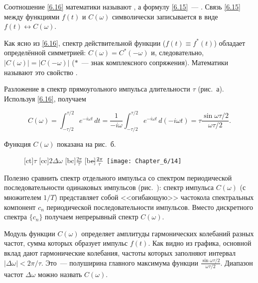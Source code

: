 Соотношение \eqref{6.16} математики называют , а формулу \eqref{6.15}~--- . Связь \eqref{6.15} между функциями $f(t)$ и $C(\omega)$ символически записывается в виде
$f(t)\leftrightarrow C(\omega)$.

Как ясно из \eqref{6.16}, спектр действительной функции ($f(t)\equiv f^*(t)$) обладает определённой симметрией:
$C(\omega)=C^*(-\omega)$ и, следовательно, $|C(\omega)|=|C(-\omega)|$ ($*$~--- знак комплексного сопряжения). Математики называют это
свойство .

 Разложение в спектр прямоугольного импульса длительности $\tau$ (рис.~а). Используя \eqref{6.16}, получаем

\begin{equation*}
	C(\omega)=\int_{-\tau/2}^{\tau/2} e^{-i\omega t}\,dt=\frac{1}{-i\omega}\int_{-\tau/2}^{\tau/2} e^{-i\omega t}\,
d(-i\omega t)=\tau\frac{\sin\omega\tau/2}{\omega\tau/2}.
\end{equation*}

Функция $C(\omega)$ показана на рис.~б.
\begin{figure}[h!]
	[ct]{$\tau$}
	[cc]{$2\Delta\omega$}
	[bc]{$\frac{2\pi}{\tau}$}
	[bc]{$\llap{$-$}\frac{2\pi}{\tau}$}
	\texttt{[image: Chapter\_6/14]}
	\caption{}
\end{figure}

Полезно сравнить спектр отдельного импульса со спектром периодической последовательности одинаковых импульсов (рис.~):
спектр импульса $C(\omega)$ (с множителем $1/T$) представляет собой <<огибающую>> частокола спектральных компонент $c_n$
периодической последовательности импульсов. Вместо дискретного спектра $\{c_n\}$ получаем непрерывный спектр $C(\omega)$.

Модуль функции $C(\omega)$ определяет амплитуды гармонических колебаний разных частот, сумма которых образует импульс
$f(t)$. Как видно из графика, основной вклад дают гармонические колебания, частоты которых заполняют интервал
$|\Delta\omega|<2\pi/\tau$. Это~--- полуширина главного максимума функции
$\frac{\sin\omega\tau/2}{\omega\tau/2}$. Диапазон частот $\Delta\omega$ можно назвать  $C(\omega)$.


